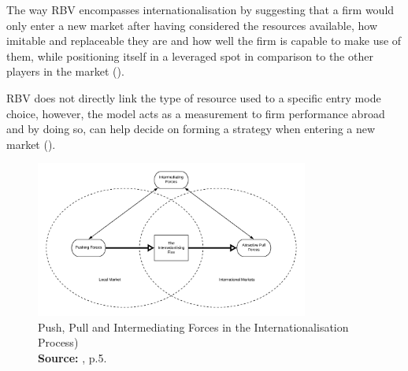 \documentclass[11pt,a4paper]{article}
\newcommand*{\captionsource}[2]{%
  \caption[{#1}]{%
    #1%
    \\\hspace{\linewidth}%
    \textbf{Source:} #2%
  }%
}
\begin{document}
{{The way RBV encompasses internationalisation by suggesting that a firm would only enter a new market after having considered the resources available, how imitable and replaceable they are and how well the firm is capable to make use of them, while positioning itself in a leveraged spot in comparison to the other players in the market (\cite{ruzzierResourcebasedApproachInternationalisation2006}).  \par
RBV does not directly link the type of resource used to a specific entry mode choice, however, the model acts as a measurement to firm performance abroad and by doing so, can help decide on forming a strategy when entering a new market (\cite{tulungResourceAvailabilityFirm2017}). 



\newpage





  \vspace{5mm}
\begin{figure}[H]
	\centering
  \includegraphics[width=0.8\textwidth, scale=0.1]{figures/fig_pull_push_forces}
  \vspace{5mm}
    \captionsetup{justification=centering,margin=2cm}
      \captionsource{Push, Pull and Intermediating Forces in the Internationalisation Process)}{\cite{etemadInternationalizationSmallMediumsized2004}, p.5.}
	\label{fig:pull_push_forces}
\end{figure}

}}
\end{document}
